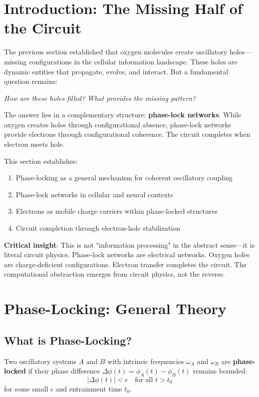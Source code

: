 \section{Introduction: The Missing Half of the Circuit}

The previous section established that oxygen molecules create oscillatory holes—missing configurations in the cellular information landscape. These holes are dynamic entities that propagate, evolve, and interact. But a fundamental question remains:

\textit{How are these holes filled? What provides the missing pattern?}

The answer lies in a complementary structure: \textbf{phase-lock networks}. While oxygen creates holes through configurational absence, phase-lock networks provide electrons through configurational coherence. The circuit completes when electron meets hole.

This section establishes:
\begin{enumerate}
\item Phase-locking as a general mechanism for coherent oscillatory coupling
\item Phase-lock networks in cellular and neural contexts
\item Electrons as mobile charge carriers within phase-locked structures
\item Circuit completion through electron-hole stabilization
\end{enumerate}

\textbf{Critical insight}: This is not "information processing" in the abstract sense—it is literal circuit physics. Phase-lock networks are electrical networks. Oxygen holes are charge-deficient configurations. Electron transfer completes the circuit. The computational abstraction emerges from circuit physics, not the reverse.

\section{Phase-Locking: General Theory}

\subsection{What is Phase-Locking?}

\begin{definition}
\label{def:phase_lock}
Two oscillatory systems $A$ and $B$ with intrinsic frequencies $\omega_A$ and $\omega_B$ are \textbf{phase-locked} if their phase difference $\Delta\phi(t) = \phi_A(t) - \phi_B(t)$ remains bounded:
\begin{equation}
|\Delta\phi(t)| < \epsilon \quad \text{for all } t > t_0
\end{equation}
for some small $\epsilon$ and entrainment time $t_0$.
\end{definition}

